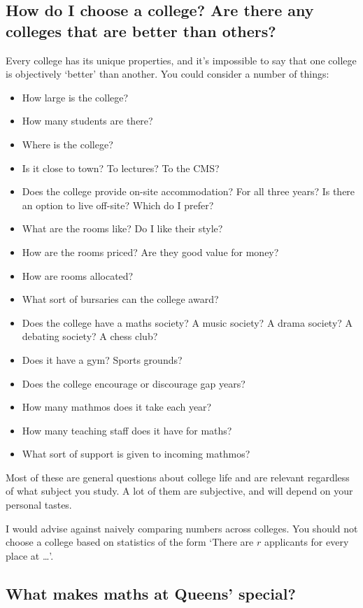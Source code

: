 \documentclass[a4paper]{article}
\begin{document}
\subsection{How do I choose a college? Are there any colleges that are better
than others?}

Every college has its unique properties, and it's impossible to say that one
college is objectively `better' than another. You could consider a number of
things:

\begin{itemize}
\item How large is the college? 
\item How many students are there?
\item Where is the college?
\item Is it close to town? To lectures? To the CMS? 
\item Does the college provide on-site accommodation? For all three years? Is there an option to live off-site? Which do I prefer?
\item What are the rooms like? Do I like their style? 
\item How are the rooms priced? Are they good value for money?
\item How are rooms allocated?
\item What sort of bursaries can the college award?
\item Does the college have a maths society? A music society? A drama society? A debating society? A chess club?
\item Does it have a gym? Sports grounds? 
\item Does the college encourage or discourage gap years?
\item How many mathmos does it take each year?
\item How many teaching staff does it have for maths?
\item What sort of support is given to incoming mathmos?
\end{itemize}

Most of these are general questions about college life and are relevant
regardless of what subject you study. A lot of them are subjective, and will
depend on your personal tastes.

I would advise against naively comparing numbers across colleges. You should not
choose a college based on statistics of the form `There are $r$ applicants for
every place at \dots'. 

\subsection{What makes maths at Queens' special?}
\end{document}
